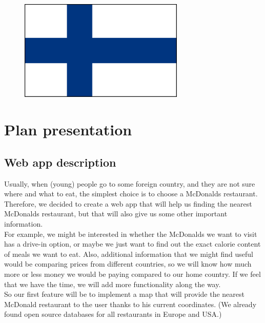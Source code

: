 \documentclass[12pt]{article}
\begin{document}
\begin{figure} [h!]
\begin{minipage}[c]{0.24\linewidth}
                \includegraphics[width=0.7\textwidth]{./Pictures/finnish.png}
            \end{minipage}
        \end{figure}

        \vspace{-1em}

    {\color{color_section}\section{Plan presentation}}
        {\color{color_subsection}\subsection{Web app description}}
        
        Usually, when (young) people go to some foreign country, and they
        are not sure where and what to eat, the simplest choice is to
        choose a McDonalds restaurant. Therefore, we decided to create a web 
        app that will help us finding the nearest McDonalds restaurant, 
        but that will also give us some other important information.\\
        
        \noindent For example, we might be interested in whether the McDonalds we want 
        to visit has a drive-in option, or maybe we just want to find out 
        the exact calorie content of meals we want to eat. Also, additional 
        information that we might find useful would be comparing prices from 
        different countries, so we will know how much more or less money we would be 
        paying compared to our home country. If we feel that we 
        have the time, we will add more functionality along the way.\\

        \noindent So our first feature will be to implement a map that will provide
        the nearest McDonald restaurant to the user thanks to his current coordinates.
        (We already found open source databases for all restaurants in Europe and USA.)\\
\end{document}
